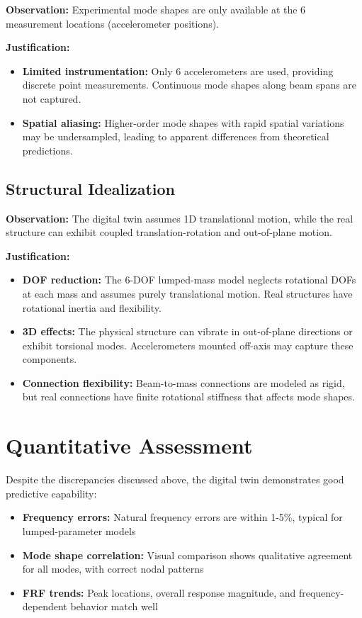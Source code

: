 \documentclass[11pt,a4paper]{article}
\begin{document}
\textbf{Observation:} Experimental mode shapes are only available at the 6 measurement locations (accelerometer positions).

\textbf{Justification:}
\begin{itemize}[leftmargin=*]
    \item \textbf{Limited instrumentation:} Only 6 accelerometers are used, providing discrete point measurements. Continuous mode shapes along beam spans are not captured.

    \item \textbf{Spatial aliasing:} Higher-order mode shapes with rapid spatial variations may be undersampled, leading to apparent differences from theoretical predictions.
\end{itemize}

\subsection{Structural Idealization}

\textbf{Observation:} The digital twin assumes 1D translational motion, while the real structure can exhibit coupled translation-rotation and out-of-plane motion.

\textbf{Justification:}
\begin{itemize}[leftmargin=*]
    \item \textbf{DOF reduction:} The 6-DOF lumped-mass model neglects rotational DOFs at each mass and assumes purely translational motion. Real structures have rotational inertia and flexibility.

    \item \textbf{3D effects:} The physical structure can vibrate in out-of-plane directions or exhibit torsional modes. Accelerometers mounted off-axis may capture these components.

    \item \textbf{Connection flexibility:} Beam-to-mass connections are modeled as rigid, but real connections have finite rotational stiffness that affects mode shapes.
\end{itemize}

\section{Quantitative Assessment}

Despite the discrepancies discussed above, the digital twin demonstrates good predictive capability:

\begin{itemize}[leftmargin=*]
    \item \textbf{Frequency errors:} Natural frequency errors are within 1-5\%, typical for lumped-parameter models

    \item \textbf{Mode shape correlation:} Visual comparison shows qualitative agreement for all modes, with correct nodal patterns

    \item \textbf{FRF trends:} Peak locations, overall response magnitude, and frequency-dependent behavior match well
\end{itemize}
\end{document}
